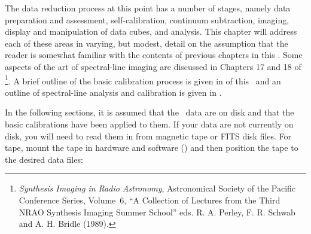      The data reduction process at this point has a number of stages,
namely data preparation and assessment, self-calibration, continuum
subtraction, imaging, display and manipulation of data cubes, and
analysis.  This chapter will address each of these areas in varying,
but modest, detail on the assumption that the reader is somewhat
familiar with the contents of previous chapters in this \Cookbook.
Some aspects of the art of spectral-line imaging are discussed in
Chapters 17 and 18 of {\it {}}\footnote{{\it Synthesis Imaging in Radio Astronomy},
Astronomical Society of the Pacific Conference Series, Volume~6, ``A
Collection of Lectures from the Third NRAO Synthesis Imaging Summer
School'' eds. R. A. Perley, F. R. Schwab and A. H. Bridle (1989).}.  A
brief outline of the basic calibration process is given in
 of this \Cookbook\ and an outline of spectral-line
analysis and calibration is given in .


     In the following sections, it is assumed that the \uv\ data are
on disk and that the basic calibrations have been applied to them.  If
your data are not currently on disk, you will need to read them in
from magnetic tape or FITS disk files.  For tape, mount the tape in
hardware and software () and then position the tape to
the desired data files:

